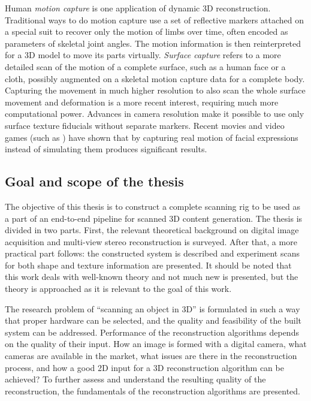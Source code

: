 
Human \emph{motion capture} is one application of dynamic 3D reconstruction.
Traditional ways to do motion capture use a set of reflective markers attached on a special suit to recover only the motion of limbs over time, often encoded as parameters of skeletal joint angles.
The motion information is then reinterpreted for a 3D model to move its parts virtually.
\emph{Surface capture} refers to a more detailed scan of the motion of a complete surface, such as a human face or a cloth, possibly augmented on a skeletal motion capture data for a complete body.
Capturing the movement in much higher resolution to also scan the whole surface movement and deformation is a more recent interest, requiring much more computational power.
Advances in camera resolution make it possible to use only surface texture fiducials without separate markers.
Recent movies and video games (such as \cite{rockstar2011noire}) have shown that by capturing real motion of facial expressions instead of simulating them produces significant results.


\subsection{Goal and scope of the thesis}

The objective of this thesis is to construct a complete scanning rig to be used as a part of an end-to-end pipeline for scanned 3D content generation.
The thesis is divided in two parts.
First, the relevant theoretical background on digital image acquisition and multi-view stereo reconstruction is surveyed.
After that, a more practical part follows: the constructed system is described and experiment scans for both shape and texture information are presented.
It should be noted that this work deals with well-known theory and not much new is presented, but the theory is approached as it is relevant to the goal of this work.

The research problem of ``scanning an object in 3D'' is formulated in such a way that proper hardware can be selected, and the quality and feasibility of the built system can be addressed.
Performance of the reconstruction algorithms depends on the quality of their input.
How an image is formed with a digital camera, what cameras are available in the market, what issues are there in the reconstruction process, and how a good 2D input for a 3D reconstruction algorithm can be achieved?
To further assess and understand the resulting quality of the reconstruction, the fundamentals of the reconstruction algorithms are presented.

